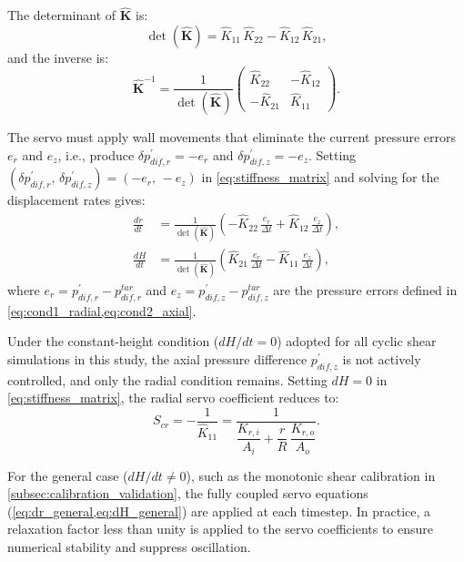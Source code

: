 \documentclass[a4paper,fleqn]{cas-sc}
\begin{document}
The determinant of $\hat{\mathbf{K}}$ is:
\begin{equation}
\det(\hat{\mathbf{K}}) = \hat{K}_{11}\,\hat{K}_{22} - \hat{K}_{12}\,\hat{K}_{21},
\label{eq:det_K}
\end{equation}
and the inverse is:
\begin{equation}
\hat{\mathbf{K}}^{-1}
=
\frac{1}{\det(\hat{\mathbf{K}})}
\begin{pmatrix} \hat{K}_{22} & -\hat{K}_{12} \\[6pt] -\hat{K}_{21} & \hat{K}_{11} \end{pmatrix}.
\label{eq:stiffness_matrix_inv}
\end{equation}

The servo must apply wall movements that eliminate the current pressure errors $e_r$ and $e_z$, i.e., produce $\delta p_{dif,r}^{\prime}=-e_r$ and $\delta p_{dif,z}^{\prime}=-e_z$. Setting $(\delta p_{dif,r}^{\prime},\,\delta p_{dif,z}^{\prime})=(-e_r,\,-e_z)$ in \cref{eq:stiffness_matrix} and solving for the displacement rates gives:
\begin{align}
\frac{dr}{dt} &= \frac{1}{\det(\hat{\mathbf{K}})}\!\left(-\hat{K}_{22}\,\frac{e_r}{\Delta t} + \hat{K}_{12}\,\frac{e_z}{\Delta t}\right), \label{eq:dr_general}\\[6pt]
\frac{dH}{dt} &= \frac{1}{\det(\hat{\mathbf{K}})}\!\left(\hat{K}_{21}\,\frac{e_r}{\Delta t} - \hat{K}_{11}\,\frac{e_z}{\Delta t}\right), \label{eq:dH_general}
\end{align}
where $e_r=p_{dif,r}^{\prime}-p_{dif,r}^{tar}$ and $e_z=p_{dif,z}^{\prime}-p_{dif,z}^{tar}$ are the pressure errors defined in \cref{eq:cond1_radial,eq:cond2_axial}.

Under the constant-height condition ($dH/dt=0$) adopted for all cyclic shear simulations in this study, the axial pressure difference $p_{dif,z}^{\prime}$ is not actively controlled, and only the radial condition remains. Setting $dH=0$ in \cref{eq:stiffness_matrix}, the radial servo coefficient reduces to:
\begin{equation}
S_{cr} = -\frac{1}{\hat{K}_{11}} = \frac{1}{\dfrac{K_{r,i}}{A_i}+\dfrac{r}{R}\,\dfrac{K_{r,o}}{A_o}}.
\label{eq:Scr_constantH}
\end{equation}

For the general case ($dH/dt\neq 0$), such as the monotonic shear calibration in \cref{subsec:calibration_validation}, the fully coupled servo equations (\cref{eq:dr_general,eq:dH_general}) are applied at each timestep. In practice, a relaxation factor less than unity is applied to the servo coefficients to ensure numerical stability and suppress oscillation.
\end{document}
